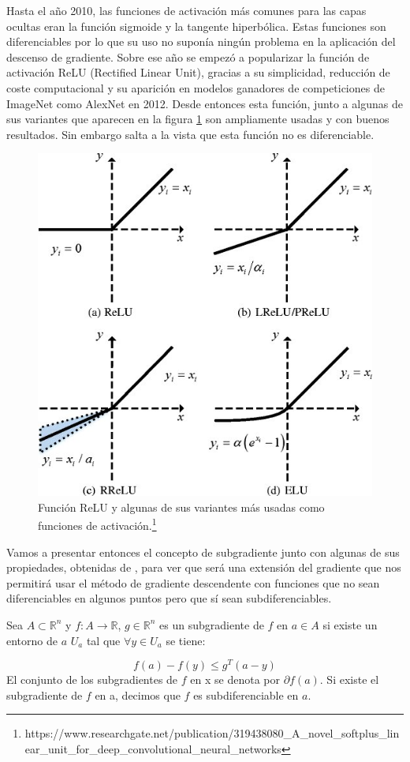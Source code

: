 Hasta el año 2010, las funciones de activación más comunes para las capas ocultas eran la función sigmoide y la tangente hiperbólica. Estas funciones son diferenciables por lo que su uso no suponía ningún problema en la aplicación del descenso de gradiente. Sobre ese año se empezó a popularizar la función de activación ReLU (Rectified Linear Unit), gracias a su simplicidad, reducción de coste computacional y su aparición en modelos ganadores de competiciones de ImageNet como AlexNet en 2012. Desde entonces esta función, junto a algunas de sus variantes que aparecen en la figura \ref{fig:3.ReLU} son ampliamente usadas y con buenos resultados. Sin embargo salta a la vista que esta función no es diferenciable.


\begin{figure}
    \centering
    \includegraphics[width=0.5\linewidth]{3ReLU&oth.jpg}
    \caption{Función ReLU y algunas de sus variantes más usadas como funciones de activación.\footnote{https://www.researchgate.net/publication/319438080\_A\_novel\_softplus\_linear\_unit\_for\_deep\_convolutional\_neural\_networks}}
    \label{fig:3.ReLU}
\end{figure}



Vamos a presentar entonces el concepto de subgradiente junto con algunas de sus propiedades, obtenidas de \cite{convexSubgrad}, para ver que será una extensión del gradiente que nos permitirá usar el método de gradiente descendente con funciones que no sean diferenciables en algunos puntos pero que sí sean subdiferenciables.

\begin{definicion}[Subgradiente]
     Sea $A \subset \mathbb{R}^n$ y $f:A \rightarrow \mathbb{R}$, $g \in \mathbb{R}^n$ es un subgradiente de $f$ en $a \in A$ si existe un entorno de $a$ $U_a$ tal que $\forall y \in U_a$ se tiene:

    $$f(a)-f(y) \leq g^T(a-y)$$
    El conjunto de los subgradientes de $f$ en x se denota por $\partial f(a)$. Si existe el subgradiente de $f$ en a, decimos que $f$ es subdiferenciable en $a$.
\end{definicion}

